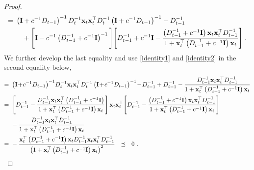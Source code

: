 \begin{proof}
\begin{align*}
=~&
 \left(\mi+c^{-1}D_{t-1}\right)^{-1}D_{t}^{-1}\vxi{t}\vxti{t}D_{t}^{-1}\left(\mi+c^{-1}D_{t-1}\right)^{-1}-D_{t-1}^{-1}\\
&\quad
+\Bigg[
\mi-c^{-1}\left(D_{t-1}^{-1}+c^{-1}\mi\right)^{-1}
\Bigg]
\Bigg[
D_{t-1}^{-1}+c^{-1}\mi\vphantom{\frac{
\left(
D_{t-1}^{-1}+c^{-1}\mi
\right)
\vxi{t}\vxti{t}
\left(
D_{t-1}^{-1}+c^{-1}\mi
\right)
}{1+\vxti{t}
\left(
D_{t-1}^{-1}+c^{-1}\mi
\right
)\vxi{t}}}
-\frac{\left(D_{t-1}^{-1}+c^{-1}\mi\right)\vxi{t}\vxti{t}D_{t-1}^{-1}}{1+\vxti{t}\left(D_{t-1}^{-1}+c^{-1}\mi\right)\vxi{t}}\Bigg]~.
\end{align*}
We further develop the last equality and use \eqref{identity1} and
\eqref{identity2} in the second equality below,
\begin{align*}
 =~ &
 \left(\mi\!+\!c^{-1}D_{t-1}\right)^{-1}\!D_{t}^{-1}\vxi{t}\vxti{t}D_{t}^{-1}\left(\mi\!+\!c^{-1}
 D_{t-1}\right)^{-1}\!-\!D_{t-1}^{-1}+D_{t-1}^{-1}-\frac{D_{t-1}^{-1}\vxi{t}\vxti{t}D_{t-1}^{-1}}{1+\vxti{t}
\left(D_{t-1}^{-1}+c^{-1}\mi\right)\vxi{t}}\\
 =~ &
 \left[
D_{t-1}^{-1}-\frac{D_{t-1}^{-1}\vxi{t}\vxti{t}\left(D_{t-1}^{-1}+c^{-1}\mi\right)}
 {1+\vxti{t}\left(D_{t-1}^{-1}+c^{-1}\mi\right)\vxi{t}}\right]\vxi{t}\vxti{t} \Bigg[D_{t-1}^{-1}\vphantom{\frac{\left(D_{t-1}^{-1}+c^{-1}\mi\right)\vxi{t}\vxti{t}D_{t-1}^{-1}}
 {1+\vxti{t}\left(D_{t-1}^{-1}+c^{-1}\mi\right)\vxi{t}}}
-\frac{\left(D_{t-1}^{-1}+c^{-1}\mi\right)\vxi{t}\vxti{t}D_{t-1}^{-1}}
 {1+\vxti{t}\left(D_{t-1}^{-1}+c^{-1}\mi\right)\vxi{t}}
\Bigg]\\
&
-\frac{D_{t-1}^{-1}\vxi{t}\vxti{t}D_{t-1}^{-1}}{1+\vxti{t}\left(D_{t-1}^{-1}+c^{-1}
\mi\right)\vxi{t}}\\
 =~ & -\frac{\vxti{t}\left(D_{t-1}^{-1}+c^{-1}\mi\right)\vxi{t}D_{t-1}^{-1}\vxi{t}\vxti{t}
 D_{t-1}^{-1}}{\left(1+\vxti{t}\left(D_{t-1}^{-1}+c^{-1}\mi\right)\vxi{t}\right)^{2}}~~\preceq~~0 ~.
\end{align*}
\QED
 \end{proof}

